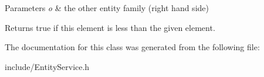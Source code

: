 \begin{DoxyParams}{Parameters}
{\em o} & the other entity family (right hand side) \\
\hline
\end{DoxyParams}
\begin{DoxyReturn}{Returns}
{\ttfamily true} if this element is less than the given element. 
\end{DoxyReturn}


The documentation for this class was generated from the following file\+:\begin{DoxyCompactItemize}
\item 
include/Entity\+Service.\+h\end{DoxyCompactItemize}
